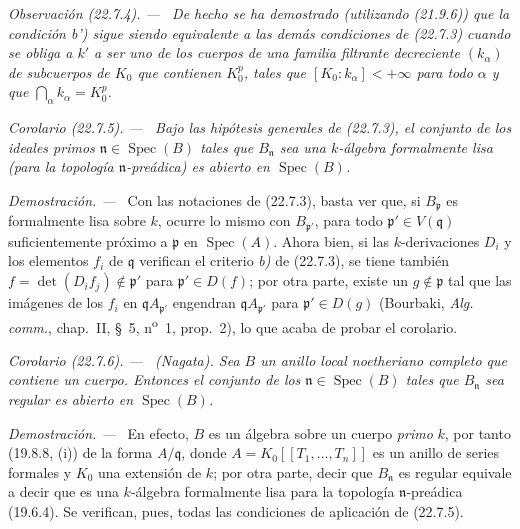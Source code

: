 \documentclass[10pt,oneside]{book}
\makeatletter
\newcommand{\setmanualcurrentlabel}[1]{\def\@currentlabel{#1}}
\newcommand{\oldpage}[2][]{%
  \setcounter{footnote}{0}%
  \marginpar{\scriptsize\textbf{#1}~|~#2}\ignorespaces}
\newenvironment{corollary}[1][]{%
  \setmanualcurrentlabel{#1}\par\medskip\noindent\itshape Corolario (#1). ---\ }{\par}
\newenvironment{remark}[1][]{%
  \setmanualcurrentlabel{#1}\par\medskip\noindent\itshape Observación (#1). ---\ }{\par}
\newenvironment{proof}{%
  \par\medskip\noindent\textit{Demostración. ---\ }}{\par}
\makeatother
\begin{document}
\oldpage[0\textsubscript{IV-1}]{213}

\begin{remark}[22.7.4]
\label{0.22.7.4-es}
De hecho se ha demostrado (utilizando (21.9.6)) que la condición \emph{b')} sigue siendo
equivalente a las demás condiciones de (22.7.3) cuando se obliga a $k'$ a
ser uno de los cuerpos de una familia filtrante decreciente $(k_\alpha)$ de
subcuerpos de $K_0$ que contienen $K_0^p$, tales que
$[K_0:k_\alpha]<+\infty$ para todo $\alpha$ y que
$\bigcap_\alpha k_\alpha=K_0^p$.
\end{remark}

\begin{corollary}[22.7.5]
\label{0.22.7.5-es}
Bajo las hipótesis generales de \textup{(22.7.3)}, el conjunto de los ideales primos
$\mathfrak n\in\operatorname{Spec}(B)$ tales que $B_{\mathfrak n}$ sea una
$k$-álgebra formalmente lisa (para la topología $\mathfrak n$-preádica)
es abierto en $\operatorname{Spec}(B)$.
\end{corollary}

\begin{proof}
Con las notaciones de (22.7.3), basta ver que, si $B_{\mathfrak p}$
es formalmente lisa sobre $k$, ocurre lo mismo con $B_{\mathfrak p'}$, para
todo $\mathfrak p'\in V(\mathfrak q)$ suficientemente próximo a $\mathfrak p$ en
$\operatorname{Spec}(A)$. Ahora bien, si las $k$-derivaciones $D_i$ y los elementos
$f_i$ de $\mathfrak q$ verifican el criterio \emph{b)} de (22.7.3), se tiene también
$f=\det(D_if_j)\notin\mathfrak p'$ para $\mathfrak p'\in D(f)$; por otra
parte, existe un $g\notin\mathfrak p$ tal que las imágenes de los $f_i$ en
$\mathfrak qA_{\mathfrak p'}$ engendran $\mathfrak qA_{\mathfrak p'}$ para
$\mathfrak p'\in D(g)$ (Bourbaki, \emph{Alg. comm.}, chap.~II, §~5,
n\textsuperscript{o}~1, prop.~2), lo que acaba de probar el corolario.
\end{proof}

\begin{corollary}[22.7.6]
\label{0.22.7.6-es}
\textnormal{(Nagata).} Sea $B$ un anillo local noetheriano completo que contiene
un cuerpo. Entonces el conjunto de los $\mathfrak n\in\operatorname{Spec}(B)$ tales
que $B_{\mathfrak n}$ sea regular es abierto en $\operatorname{Spec}(B)$.
\end{corollary}

\begin{proof}
En efecto, $B$ es un álgebra sobre un cuerpo \emph{primo} $k$, por tanto (19.8.8, (i))
de la forma $A/\mathfrak q$, donde
$A=K_0[[T_1,\ldots,T_n]]$ es un anillo de series formales y $K_0$ una
extensión de $k$; por otra parte, decir que $B_{\mathfrak n}$ es regular
equivale a decir que es una $k$-álgebra formalmente lisa para la topología
$\mathfrak n$-preádica (19.6.4). Se verifican, pues, todas las condiciones de aplicación de
(22.7.5).
\end{proof}
\end{document}

